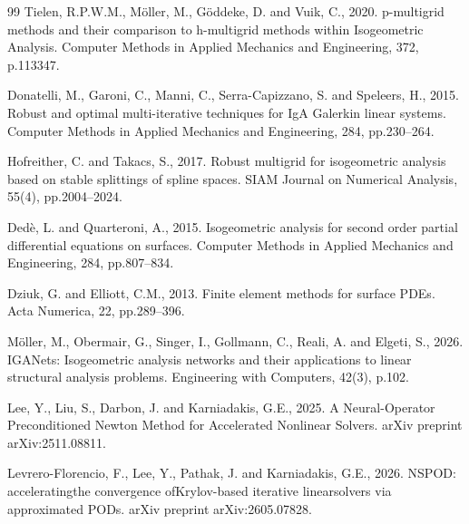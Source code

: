 \documentclass{article}
\theoremstyle{plain}
\numberwithin{equation}{section}
\begin{document}
\begin{thebibliography}{99}
    Tielen, R.P.W.M., Möller, M., Göddeke, D. and Vuik, C., 2020. p-multigrid methods and their comparison to h-multigrid methods within Isogeometric Analysis. Computer Methods in Applied Mechanics and Engineering, 372, p.113347.

    Donatelli, M., Garoni, C., Manni, C., Serra-Capizzano, S. and Speleers, H., 2015. Robust and optimal multi-iterative techniques for IgA Galerkin linear systems. Computer Methods in Applied Mechanics and Engineering, 284, pp.230--264.

    Hofreither, C. and Takacs, S., 2017. Robust multigrid for isogeometric analysis based on stable splittings of spline spaces. SIAM Journal on Numerical Analysis, 55(4), pp.2004--2024.

    Dedè, L. and Quarteroni, A., 2015. Isogeometric analysis for second order partial differential equations on surfaces. Computer Methods in Applied Mechanics and Engineering, 284, pp.807--834.

    Dziuk, G. and Elliott, C.M., 2013. Finite element methods for surface PDEs. Acta Numerica, 22, pp.289--396.

    Möller, M., Obermair, G., Singer, I., Gollmann, C., Reali, A. and Elgeti, S., 2026. IGANets: Isogeometric analysis networks and their applications to linear structural analysis problems. Engineering with Computers, 42(3), p.102.

    Lee, Y., Liu, S., Darbon, J. and Karniadakis, G.E., 2025. A Neural-Operator Preconditioned Newton Method for Accelerated Nonlinear Solvers. arXiv preprint arXiv:2511.08811.

    Levrero-Florencio, F., Lee, Y., Pathak, J. and Karniadakis, G.E., 2026. NSPOD: acceleratingthe convergence ofKrylov-based iterative linearsolvers via approximated PODs. arXiv preprint arXiv:2605.07828.

\end{thebibliography}
\end{document}
